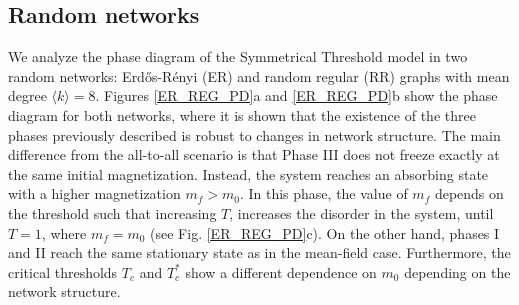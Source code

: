\subsection{Random networks}

We analyze the phase diagram of the Symmetrical Threshold model in two random networks: Erd\H{o}s-Rényi (ER) \cite{erdos1960evolution} and random regular (RR) \cite{wormald1999models} graphs with mean degree $\langle k \rangle = 8$. Figures \ref{ER_REG_PD}a and \ref{ER_REG_PD}b show the phase diagram for both networks, where it is shown that the existence of the three phases previously described is robust to changes in network structure. The main difference from the all-to-all scenario is that Phase III does not freeze exactly at the same initial magnetization. Instead, the system reaches an absorbing state with a higher magnetization $m_f > m_0$. In this phase, the value of $m_f$ depends on the threshold such that increasing $T$, increases the disorder in the system, until $T = 1$, where $m_f = m_0$ (see Fig. \ref{ER_REG_PD}c). On the other hand, phases I and II reach the same stationary state as in the mean-field case. Furthermore, the critical thresholds $T_{c}$ and $T_{c}^{*}$ show a different dependence on $m_0$ depending on the network structure.

